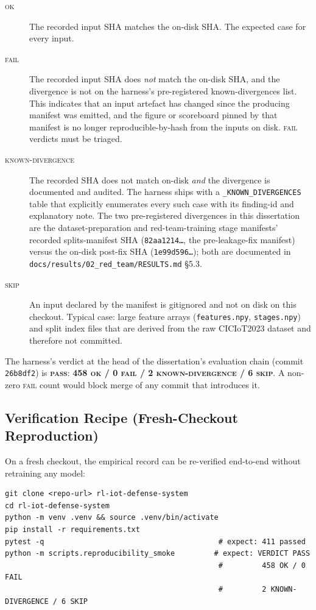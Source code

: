 \begin{description}
    \item[\textsc{ok}] The recorded input SHA matches the on-disk SHA. The expected case for every input.
    \item[\textsc{fail}] The recorded input SHA does \emph{not} match the on-disk SHA, and the divergence is not on the harness's pre-registered known-divergences list. This indicates that an input artefact has changed since the producing manifest was emitted, and the figure or scoreboard pinned by that manifest is no longer reproducible-by-hash from the inputs on disk. \textsc{fail} verdicts must be triaged.
    \item[\textsc{known-divergence}] The recorded SHA does not match on-disk \emph{and} the divergence is documented and audited. The harness ships with a \texttt{\_KNOWN\_DIVERGENCES} table that explicitly enumerates every such case with its finding-id and explanatory note. The two pre-registered divergences in this dissertation are the dataset-preparation and red-team-training stage manifests' recorded splits-manifest SHA (\texttt{82aa1214\ldots}, the pre-leakage-fix manifest) versus the on-disk post-fix SHA (\texttt{1e99d596\ldots}); both are documented in \texttt{docs/results/02\_red\_team/RESULTS.md} \S5.3.
    \item[\textsc{skip}] An input declared by the manifest is gitignored and not on disk on this checkout. Typical case: large feature arrays (\texttt{features.npy}, \texttt{stages.npy}) and split index files that are derived from the raw CICIoT2023 dataset and therefore not committed.
\end{description}

The harness's verdict at the head of the dissertation's evaluation chain (commit \texttt{26b8df2}) is \textbf{\textsc{pass}}: \textbf{458 \textsc{ok} / 0 \textsc{fail} / 2 \textsc{known-divergence} / 6 \textsc{skip}}. A non-zero \textsc{fail} count would block merge of any commit that introduces it.

\subsection{Verification Recipe (Fresh-Checkout Reproduction)}\label{app:recipe}
On a fresh checkout, the empirical record can be re-verified end-to-end without retraining any model:

\begin{verbatim}
git clone <repo-url> rl-iot-defense-system
cd rl-iot-defense-system
python -m venv .venv && source .venv/bin/activate
pip install -r requirements.txt
pytest -q                                        # expect: 411 passed
python -m scripts.reproducibility_smoke         # expect: VERDICT PASS
                                                 #         458 OK / 0 FAIL
                                                 #         2 KNOWN-DIVERGENCE / 6 SKIP
\end{verbatim}

